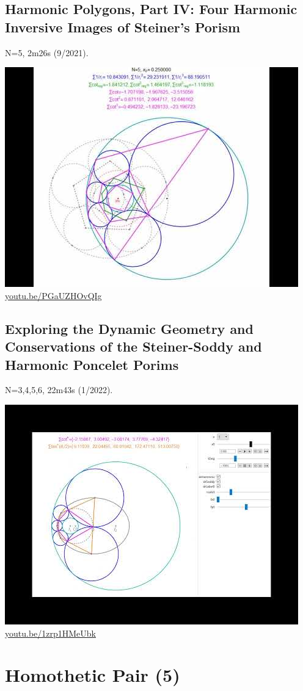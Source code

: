 \documentclass[12pt]{amsart}
\begin{document}
\subsection{Harmonic Polygons, Part IV: Four Harmonic Inversive Images of Steiner's Porism}
\label{vid:PGaUZHOvQIg}
\noindent N=5, 2m26s (9/2021). 
\begin{center}\includegraphics[width=.5\textwidth]{pics/PGaUZHOvQIg.jpg} \\ 
\href{https://youtu.be/PGaUZHOvQIg}{\url{youtu.be/PGaUZHOvQIg}}\end{center}
% 

\subsection{Exploring the Dynamic Geometry and Conservations of the Steiner-Soddy and Harmonic Poncelet Porims}
\label{vid:1zrp1HMeUbk}
\noindent N=3,4,5,6, 22m43s (1/2022). 
\begin{center}\includegraphics[width=.5\textwidth]{pics/1zrp1HMeUbk.jpg} \\ 
\href{https://youtu.be/1zrp1HMeUbk}{\url{youtu.be/1zrp1HMeUbk}}\end{center}
% 


\section{Homothetic Pair (5)}
\end{document}
